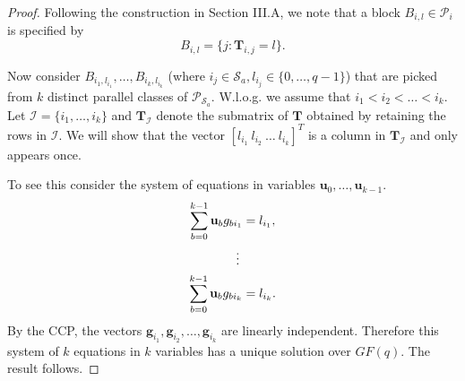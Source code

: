 \documentclass[journal,twocolumn]{IEEEtran}
\theoremstyle{definition}
\newcommand{\calP}{\mathcal{P}}
\newcommand{\calS}{\mathcal{S}}
\newcommand{\calI}{\mathcal{I}}
\newcommand{\bfg}{\mathbf{g}}
\newcommand{\bfu}{\mathbf{u}}
\newcommand{\bfT}{\mathbf{T}}
\newcommand{\bfG}{\mathbf{G}}
\begin{document}
\begin{proof}
Following the construction in Section III.A, we note that a block $B_{i,l} \in \calP_i$ is specified by
$$
B_{i,l} = \{j : \bfT_{i,j} = l\}.
$$

Now consider $B_{i_1, l_{i_1}}, \dots, B_{i_{k}, l_{i_k}}$ (where $i_j \in \calS_a, l_{i_j} \in \{0, \dots, q-1\}$) that are picked from $k$ distinct parallel classes of  $\calP_{\calS_a}$. W.l.o.g. we assume that $i_1 < i_2 < \dots < i_{k}$. Let $\calI =  \{i_1, \dots, i_{k}\}$ and $\bfT_{\calI}$ denote the submatrix of $\bfT$ obtained by retaining the rows in $\calI$. We will show that the vector $[l_{i_1}~l_{i_2}~\dots~l_{i_k}]^T$ is a column in $\bfT_{\calI}$ and only appears once.

To see this  consider the system of equations in variables $\bfu_0, \dots, \bfu_{k-1}$.
\begin{align*}
\sum_{b=0}^{k-1}\bfu_{b}g_{bi_1} &= l_{i_1},\\
\mathrel{\makebox[\widthof{=}]{\vdots}}\\
\sum_{b=0}^{k-1}\bfu_{b}g_{bi_k} &= l_{i_k}.
\end{align*}
By the CCP, the vectors $\bfg_{i_1}, \bfg_{i_2}, \ldots, \bfg_{i_k}$ are linearly independent. Therefore this system of $k$ equations in $k$ variables has a unique solution over $GF(q)$. The result follows.
\end{proof}

\end{document}
